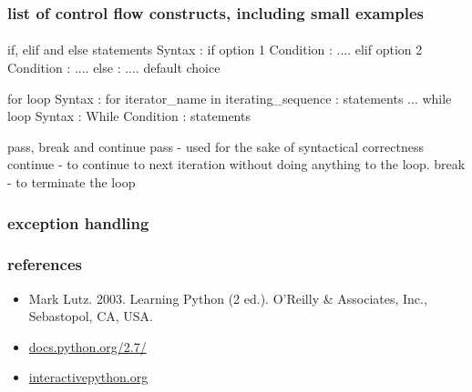 \documentclass{beamer}
\begin{document}
\begin{frame}
\frametitle{list of control flow constructs, including small examples}
\framesubtitle{}

if, elif and else statements
Syntax : if option 1 Condition :
            ....
         elif option 2 Condition :
           ....
         else :
            .... default choice   

for loop
Syntax : for iterator\_name in iterating\_sequence :
               statements
               ...
while loop
Syntax : While Condition :
            statements 

pass, break and continue
pass - used for the sake of syntactical correctness
continue - to continue to next iteration without doing anything to the loop.
break - to terminate the loop
\end{frame}

\begin{frame}
\frametitle{exception handling}
\framesubtitle{}
  
\end{frame}


%         




\begin{frame}
 \frametitle{references}
 \begin{itemize}
  \item Mark Lutz. 2003. Learning Python (2 ed.). O'Reilly \& Associates, Inc., Sebastopol, CA, USA.
  \item \href{https://docs.python.org/2.7/}{docs.python.org/2.7/}
  \item \href{http://interactivepython.org}{interactivepython.org}
 \end{itemize}
\end{frame}
\end{document}
